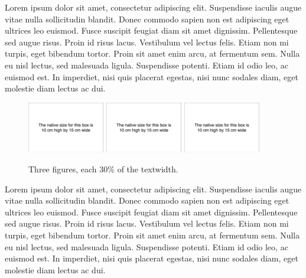 \documentclass{article}
\begin{document}
\noindent
Lorem ipsum dolor sit amet, consectetur adipiscing elit. Suspendisse
iaculis augue vitae nulla sollicitudin blandit. Donec commodo sapien non
est adipiscing eget ultrices leo euismod. Fusce suscipit feugiat diam
sit amet dignissim. Pellentesque sed augue risus. Proin id risus lacus.
Vestibulum vel lectus felis. Etiam non mi turpis, eget bibendum tortor.
Proin sit amet enim arcu, at fermentum sem. Nulla eu nisl lectus, sed
malesuada ligula. Suspendisse potenti. Etiam id odio leo, ac euismod
est. In imperdiet, nisi quis placerat egestas, nisi nunc sodales diam,
eget molestie diam lectus ac dui.

\begin{figure}
\includegraphics[width=0.3\textwidth]{fig_10x15.png}
\includegraphics[width=0.3\textwidth]{fig_10x15.png}
\includegraphics[width=0.3\textwidth]{fig_10x15.png}
\caption{Three figures, each 30\% of the textwidth.}
\label{figure5}
\end{figure}

\noindent
Lorem ipsum dolor sit amet, consectetur adipiscing elit. Suspendisse
iaculis augue vitae nulla sollicitudin blandit. Donec commodo sapien non
est adipiscing eget ultrices leo euismod. Fusce suscipit feugiat diam
sit amet dignissim. Pellentesque sed augue risus. Proin id risus lacus.
Vestibulum vel lectus felis. Etiam non mi turpis, eget bibendum tortor.
Proin sit amet enim arcu, at fermentum sem. Nulla eu nisl lectus, sed
malesuada ligula. Suspendisse potenti. Etiam id odio leo, ac euismod
est. In imperdiet, nisi quis placerat egestas, nisi nunc sodales diam,
eget molestie diam lectus ac dui.
\end{document}
